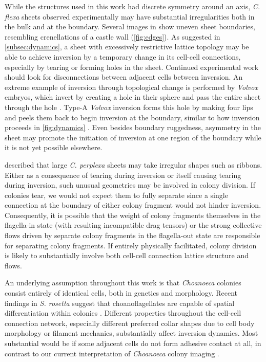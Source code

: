While the structures used in this work had discrete symmetry around an axis, \textit{C. flexa} sheets observed experimentally may have substantial irregularities both in the bulk and at the boundary. 
Several images in \citet{brunet2019} show uneven sheet boundaries, resembling crenellations of a castle wall (\cref{fig:edges}).
As suggested in \cref{subsec:dynamics}, a sheet with excessively restrictive lattice topology may be able to achieve inversion by a temporary change in its cell-cell connections, especially by tearing or forming holes in the sheet.
Continued experimental work should look for disconnections between adjacent cells between inversion.
An extreme example of inversion through topological change is performed by \textit{Volvox} embryos, which invert by creating a hole in their sphere and pass the entire sheet through the hole \citep{hohn2015}.
Type-A \textit{Volvox} inversion forms this hole by making four lips and peels them back to begin inversion at the boundary, similar to how inversion proceeds in \cref{fig:dynamics} \citep{viamontes1977}.
Even besides boundary ruggedness, asymmetry in the sheet may promote the initiation of inversion at one region of the boundary while it is not yet possible elsewhere.

\citet{leadbeater1983} described that large \textit{C. perplexa} sheets may take irregular shapes such as ribbons. 
Either as a consequence of tearing during inversion or itself causing tearing during inversion, such unusual geometries may be involved in colony division.
If colonies tear, we would not expect them to fully separate since a single connection at the boundary of either colony fragment would not hinder inversion. 
Consequently, it is possible that the weight of colony fragments themselves in the flagella-in state (with resulting incompatible drag tensors) or the strong collective flows driven by separate colony fragments in the flagella-out state are responsible for separating colony fragments.
If entirely physically facilitated, colony division is likely to substantially involve both cell-cell connection lattice structure and flows.

An underlying assumption throughout this work is that \textit{Choanoeca} colonies consist entirely of identical cells, both in genetics and morphology.
Recent findings in \textit{S. rosetta} suggest that choanoflagellates are capable of spatial differentiation within colonies \citep{laundon2019,naumann2019}.
Different properties throughout the cell-cell connection network, especially different preferred collar shapes due to cell body morphology or filament mechanics, substantially affect inversion dynamics.
Most substantial would be if some adjacent cells do not form adhesive contact at all, in contrast to our current interpretation of \textit{Choanoeca} colony imaging \citep{brunet2019}.

